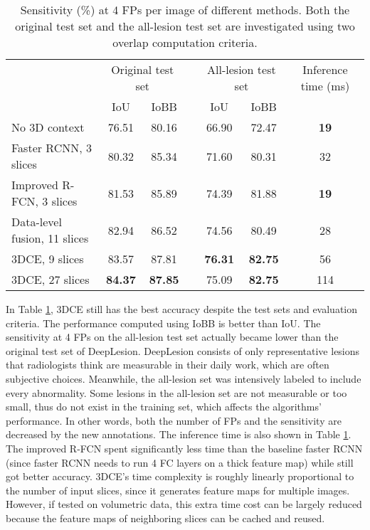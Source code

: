 \documentclass[a4paper]{llncs}
\def\Tbl#1{{Table \ref{tbl:#1}}}
\begin{document}
\begin{table}[]
	\centering
\setlength{\tabcolsep}{5pt}
	\renewcommand{\arraystretch}{1.2}
	\caption{Sensitivity (\%) at 4 FPs per image of different methods. Both the original test set and the all-lesion test set are investigated using two overlap computation criteria.}
	\begin{tabular}{p{4cm}cccccc} \hline 
		&	\multicolumn{2}{c}{Original test set} && \multicolumn{2}{c}{All-lesion test set} & \multirow{1}{1.5cm}{Inference time (ms)} \\
		& IoU	& IoBB	&& IoU	& IoBB	&  \\
		\hline
		No 3D context	&	76.51	&	80.16	&	& 	66.90	&	72.47	&	\bf 19
		\\
		Faster RCNN, 3 slices	&	80.32	&	85.34	&	& 	71.60	&	80.31	&	32
		\\
		Improved R-FCN, 3 slices	&	81.53	&	85.89	&	& 	74.39	&	81.88	&	\bf 19
		\\
		Data-level fusion, 11 slices	&	82.94	&	86.52	&	& 	74.56	&	80.49	&	28 \\
		3DCE, 9 slices	&	83.57	&	87.81	&	& 	\bf 76.31	&	\bf 82.75	&	56 \\
		3DCE, 27 slices	&	\bf 84.37	&	\bf 87.85	&	& 	75.09	&	\bf 82.75	&	114 \\
		\hline
	\end{tabular}

	\label{tbl:acc} \end{table}

In \Tbl{acc}, 3DCE still has the best accuracy despite the test sets and evaluation criteria. The performance computed using IoBB is better than IoU. The sensitivity at 4 FPs on the all-lesion test set actually became lower than the original test set of DeepLesion. DeepLesion consists of only representative lesions that radiologists think are measurable in their daily work, which are often subjective choices. Meanwhile, the all-lesion set was intensively labeled to include every abnormality. Some lesions in the all-lesion set are not measurable or too small, thus do not exist in the training set, which affects the algorithms' performance. In other words, both the number of FPs and the sensitivity are decreased by the new annotations. The inference time is also shown in \Tbl{acc}. The improved R-FCN spent significantly less time than the baseline faster RCNN (since faster RCNN needs to run 4 FC layers on a thick feature map) while still got better accuracy. 3DCE's time complexity is roughly linearly proportional to the number of input slices, since it generates feature maps for multiple images. However, if tested on volumetric data, this extra time cost can be largely reduced because the feature maps of neighboring slices can be cached and reused.
\end{document}
